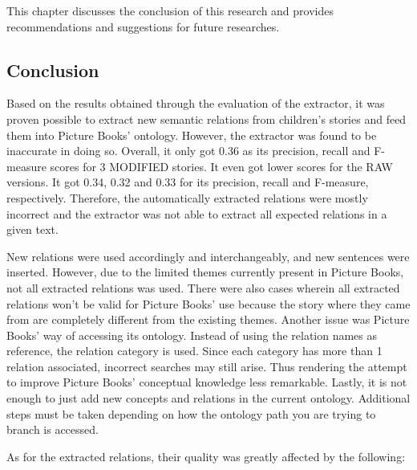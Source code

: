 %
%
%                 

\label{sec:conclusionandreco}

This chapter discusses the conclusion of this research and provides recommendations and suggestions for future researches.

\subsection{Conclusion}
\label{sec:conclusion}

Based on the results obtained through the evaluation of the extractor, it was proven possible to extract new semantic relations from children's stories and feed them into Picture Books' ontology. However, the extractor was found to be inaccurate in doing so. Overall, it only got 0.36 as its precision, recall and F-measure scores for 3 MODIFIED stories. It even got lower scores for the RAW versions. It got 0.34, 0.32 and 0.33 for its precision, recall and F-measure, respectively. Therefore, the automatically extracted relations were mostly incorrect and the extractor was not able to extract all expected relations in a given text.

New relations were used accordingly and interchangeably, and new sentences were inserted. However, due to the limited themes currently present in Picture Books, not all extracted relations was used. There were also cases wherein all extracted relations won't be valid for Picture Books' use because the story where they came from are completely different from the existing themes. Another issue was Picture Books' way of accessing its ontology. Instead of using the relation names as reference, the relation category is used. Since each category has more than 1 relation associated, incorrect searches may still arise. Thus rendering the attempt to improve Picture Books' conceptual knowledge less remarkable. Lastly, it is not enough to just add new concepts and relations in the current ontology. Additional steps must be taken depending on how the ontology path you are trying to branch is accessed.

As for the extracted relations, their quality was greatly affected by the following:


